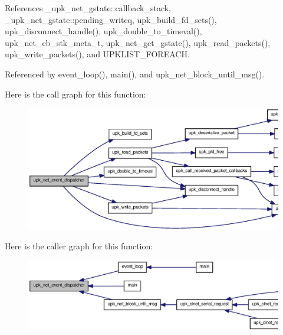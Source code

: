 References \_\-upk\_\-net\_\-gstate::callback\_\-stack, \_\-upk\_\-net\_\-gstate::pending\_\-writeq, upk\_\-build\_\-fd\_\-sets(), upk\_\-disconnect\_\-handle(), upk\_\-double\_\-to\_\-timeval(), upk\_\-net\_\-cb\_\-stk\_\-meta\_\-t, upk\_\-net\_\-get\_\-gstate(), upk\_\-read\_\-packets(), upk\_\-write\_\-packets(), and UPKLIST\_\-FOREACH.



Referenced by event\_\-loop(), main(), and upk\_\-net\_\-block\_\-until\_\-msg().



Here is the call graph for this function:\nopagebreak
\begin{figure}[H]
\begin{center}
\leavevmode
\includegraphics[width=400pt]{group__upk__network_ga903e995b09efa15de0a8088a0005c42b_cgraph}
\end{center}
\end{figure}




Here is the caller graph for this function:\nopagebreak
\begin{figure}[H]
\begin{center}
\leavevmode
\includegraphics[width=400pt]{group__upk__network_ga903e995b09efa15de0a8088a0005c42b_icgraph}
\end{center}
\end{figure}


